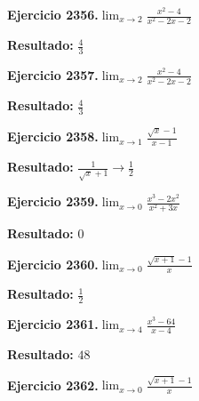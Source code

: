\documentclass[10pt,a4paper]{article}
\begin{document}
\begin{ejbox}
\textbf{Ejercicio 2356.}\quad $\lim_{x\to 2} \frac{x^2-4}{x^2-2x-2}$
\end{ejbox}

\begin{solbox}
\textbf{Resultado:} \(\displaystyle \frac{4}{3}\)
\end{solbox}

\newpage
\begin{ejbox}
\textbf{Ejercicio 2357.}\quad $\lim_{x\to 2} \frac{x^2-4}{x^2-2x-2}$
\end{ejbox}

\begin{solbox}
\textbf{Resultado:} \(\displaystyle \frac{4}{3}\)
\end{solbox}

\begin{ejbox}
\textbf{Ejercicio 2358.}\quad $\lim_{x\to 1} \frac{\sqrt{x}-1}{x-1}$
\end{ejbox}

\begin{solbox}
\textbf{Resultado:} \(\displaystyle \frac{1}{\sqrt{x}+1} \to \frac{1}{2}\)
\end{solbox}

\begin{ejbox}
\textbf{Ejercicio 2359.}\quad $\lim_{x\to 0} \frac{x^3-2x^2}{x^2+3x}$
\end{ejbox}

\begin{solbox}
\textbf{Resultado:} \(\displaystyle 0\)
\end{solbox}

\newpage
\begin{ejbox}
\textbf{Ejercicio 2360.}\quad $\lim_{x\to 0} \frac{\sqrt{x+1}-1}{x}$
\end{ejbox}

\begin{solbox}
\textbf{Resultado:} \(\displaystyle \frac{1}{2}\)
\end{solbox}

\begin{ejbox}
\textbf{Ejercicio 2361.}\quad $\lim_{x\to 4} \frac{x^3-64}{x-4}$
\end{ejbox}

\begin{solbox}
\textbf{Resultado:} \(\displaystyle 48\)
\end{solbox}

\begin{ejbox}
\textbf{Ejercicio 2362.}\quad $\lim_{x\to 0} \frac{\sqrt{x+1}-1}{x}$
\end{ejbox}
\end{document}
